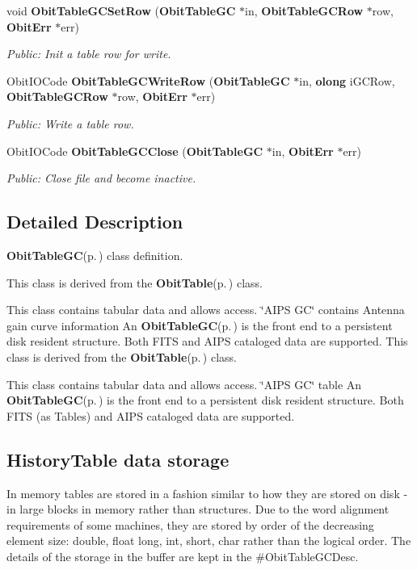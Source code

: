 \begin{CompactItemize}
void {\bf Obit\-Table\-GCSet\-Row} ({\bf Obit\-Table\-GC} $\ast$in, {\bf Obit\-Table\-GCRow} $\ast$row, {\bf Obit\-Err} $\ast$err)
\begin{CompactList}\small\item\em Public: Init a table row for write. \item\end{CompactList}\item 
Obit\-IOCode {\bf Obit\-Table\-GCWrite\-Row} ({\bf Obit\-Table\-GC} $\ast$in, {\bf olong} i\-GCRow, {\bf Obit\-Table\-GCRow} $\ast$row, {\bf Obit\-Err} $\ast$err)
\begin{CompactList}\small\item\em Public: Write a table row. \item\end{CompactList}\item 
Obit\-IOCode {\bf Obit\-Table\-GCClose} ({\bf Obit\-Table\-GC} $\ast$in, {\bf Obit\-Err} $\ast$err)
\begin{CompactList}\small\item\em Public: Close file and become inactive. \item\end{CompactList}\end{CompactItemize}


\subsection{Detailed Description}
{\bf Obit\-Table\-GC}{\rm (p.\,\pageref{structObitTableGC})} class definition. 

This class is derived from the {\bf Obit\-Table}{\rm (p.\,\pageref{structObitTable})} class.

This class contains tabular data and allows access. \char`\"{}AIPS GC\char`\"{} contains Antenna gain curve information An {\bf Obit\-Table\-GC}{\rm (p.\,\pageref{structObitTableGC})} is the front end to a persistent disk resident structure. Both FITS and AIPS cataloged data are supported. This class is derived from the {\bf Obit\-Table}{\rm (p.\,\pageref{structObitTable})} class.

This class contains tabular data and allows access. \char`\"{}AIPS GC\char`\"{} table An {\bf Obit\-Table\-GC}{\rm (p.\,\pageref{structObitTableGC})} is the front end to a persistent disk resident structure. Both FITS (as Tables) and AIPS cataloged data are supported.\subsection{History\-Table data storage}\label{ObitTableWX_8h_TableDataStorage}
In memory tables are stored in a fashion similar to how they are stored on disk - in large blocks in memory rather than structures. Due to the word alignment requirements of some machines, they are stored by order of the decreasing element size: double, float long, int, short, char rather than the logical order. The details of the storage in the buffer are kept in the \#Obit\-Table\-GCDesc.

